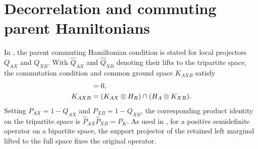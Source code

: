 \section{Decorrelation and commuting parent Hamiltonians}%
\label{sec:decorrelation}

In \cite[Appendix~D.2]{Cirac2016MPDO_arXiv}, the parent commuting Hamiltonian
condition is stated for local projectors $Q_{AX}$ and $Q_{XB}$. With
$\widehat Q_{AX}$ and $\widehat Q_{XB}$ denoting their lifts to the tripartite space,
the commutation condition and common ground space $K_{AXB}$ satisfy
\begin{align}
    [\widehat Q_{AX},\widehat Q_{XB}] & = 0, \notag                                          \\
    K_{AXB}                           & = (K_{AX}\otimes H_B)\cap(H_A\otimes K_{XB}). \notag
\end{align}
Setting $P_{AX}=1-Q_{AX}$ and $P_{XB}=1-Q_{XB}$, the corresponding product
identity on the tripartite space is $\widehat P_{AX}\widehat P_{XB}=P_K$.
As used in \cite[Appendix~D.2]{Cirac2016MPDO_arXiv}, for a positive
semidefinite operator on a bipartite space, the support projector of the
retained left marginal lifted to the full space fixes the original operator.



